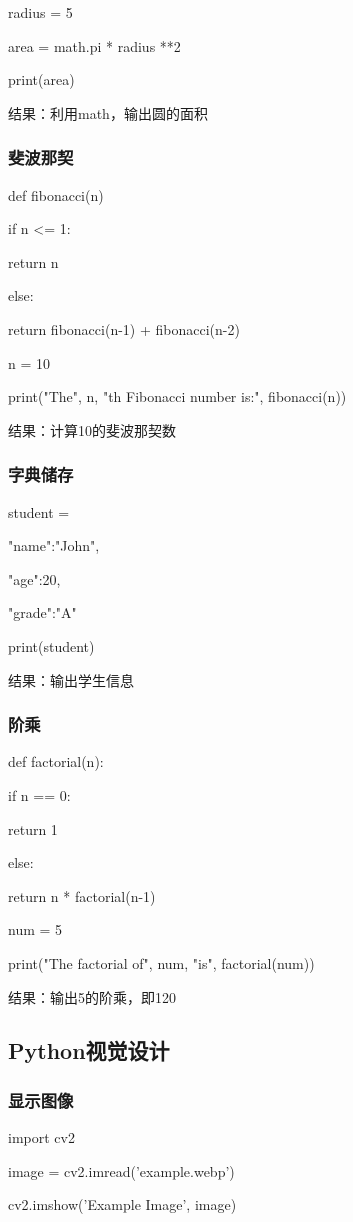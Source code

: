 \documentclass{ctexart}
\begin{document}
radius = 5

area = math.pi * radius **2

print(area)

结果：利用math，输出圆的面积
\subsubsection{斐波那契}
def fibonacci(n)

if n <= 1:

return n

else:

return fibonacci(n-1) + fibonacci(n-2)

n = 10

print("The", n, "th Fibonacci number is:", fibonacci(n))

结果：计算10的斐波那契数
\subsubsection{字典储存}
student = {

"name":"John",

"age":20,

"grade":"A"

}

print(student)

结果：输出学生信息
\subsubsection{阶乘}
def factorial(n):

    if n == 0:
    
        return 1
        
    else:
    
        return n * factorial(n-1)

num = 5

print("The factorial of", num, "is", factorial(num))

结果：输出5的阶乘，即120
\subsection{Python视觉设计}
\subsubsection{显示图像}
import cv2

image = cv2.imread('example.webp')

cv2.imshow('Example Image', image)
\end{document}

